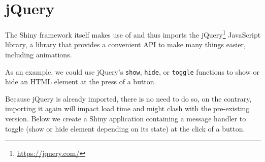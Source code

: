 \documentclass[10pt,]{krantz}
\makeatletter
\newenvironment{Shaded}{\begin{snugshade}}{\end{snugshade}}
\newcommand{\AttributeTok}[1]{\textcolor[rgb]{0.61,0.61,0.61}{#1}}
\newcommand{\CommentTok}[1]{\textcolor[rgb]{0.37,0.37,0.37}{\textit{#1}}}
\newcommand{\ControlFlowTok}[1]{\textcolor[rgb]{0.27,0.27,0.27}{\textbf{#1}}}
\newcommand{\DataTypeTok}[1]{\textcolor[rgb]{0.27,0.27,0.27}{#1}}
\newcommand{\KeywordTok}[1]{\textcolor[rgb]{0.27,0.27,0.27}{\textbf{#1}}}
\newcommand{\NormalTok}[1]{#1}
\newcommand{\OperatorTok}[1]{\textcolor[rgb]{0.43,0.43,0.43}{\textbf{#1}}}
\newcommand{\StringTok}[1]{\textcolor[rgb]{0.5,0.5,0.5}{#1}}
\renewcommand{\href}[2]{#2\footnote{\url{#1}}}
\newenvironment{kframe}{%
\medskip{}
\setlength{\fboxsep}{.8em}
 \def\at@end@of@kframe{}%
 \ifinner\ifhmode%
  \def\at@end@of@kframe{\end{minipage}}%
  \begin{minipage}{\columnwidth}%
 \fi\fi%
 \def\FrameCommand##1{\hskip\@totalleftmargin \hskip-\fboxsep
 \colorbox{shadecolor}{##1}\hskip-\fboxsep
     \hskip-\linewidth \hskip-\@totalleftmargin \hskip\columnwidth}%
 \MakeFramed {\advance\hsize-\width
   \@totalleftmargin\z@ \linewidth\hsize
   \@setminipage}}%
 {\par\unskip\endMakeFramed%
 \at@end@of@kframe}
\renewenvironment{Shaded}{\begin{kframe}}{\end{kframe}}
\makeatother
\begin{document}
\hypertarget{shiny-tips-jQuery}{%
\section{jQuery}\label{shiny-tips-jQuery}}

The Shiny framework itself makes use of and thus imports the \href{https://jquery.com/}{jQuery} JavaScript library, a library that provides a convenient API to make many things easier, including animations.

As an example, we could use jQuery's \texttt{show}, \texttt{hide}, or \texttt{toggle} functions to show or hide an HTML element at the press of a button.

\begin{Shaded}
\end{Shaded}

Because jQuery is already imported, there is no need to do so, on the contrary, importing it again will impact load time and might clash with the pre-existing version. Below we create a Shiny application containing a message handler to toggle (show or hide element depending on its state) at the click of a button.

\begin{Shaded}
\end{Shaded}
\end{document}
